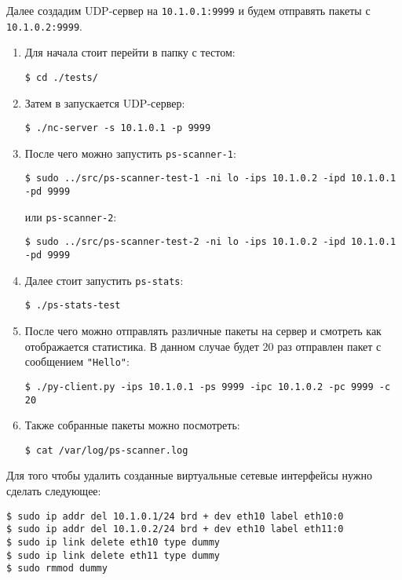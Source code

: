 Далее создадим UDP-сервер на \verb|10.1.0.1:9999| и будем отправять пакеты с \verb|10.1.0.2:9999|.

\begin{enumerate}
\item Для начала стоит перейти в папку с тестом:
\begin{lstlisting}
$ cd ./tests/
\end{lstlisting}

\item Затем в запускается UDP-сервер:
\begin{lstlisting}
$ ./nc-server -s 10.1.0.1 -p 9999
\end{lstlisting}

\item После чего можно запустить \verb|ps-scanner-1|:
\begin{lstlisting}
$ sudo ../src/ps-scanner-test-1 -ni lo -ips 10.1.0.2 -ipd 10.1.0.1 -pd 9999
\end{lstlisting}
или \verb|ps-scanner-2|:
\begin{lstlisting}
$ sudo ../src/ps-scanner-test-2 -ni lo -ips 10.1.0.2 -ipd 10.1.0.1 -pd 9999
\end{lstlisting}

\item Далее стоит запустить \verb|ps-stats|:
\begin{lstlisting}
$ ./ps-stats-test
\end{lstlisting}

\item После чего можно отправлять различные пакеты на сервер и смотреть как отображается статистика. В данном случае будет 20 раз отправлен пакет с сообщением \verb|"Hello"|:
\begin{lstlisting}
$ ./py-client.py -ips 10.1.0.1 -ps 9999 -ipc 10.1.0.2 -pc 9999 -c 20
\end{lstlisting}

\newpage

\item Также собранные пакеты можно посмотреть:
\begin{lstlisting}
$ cat /var/log/ps-scanner.log
\end{lstlisting}
\end{enumerate}

\linespace

Для того чтобы удалить созданные виртуальные сетевые интерфейсы нужно сделать следующее:
\begin{lstlisting}
$ sudo ip addr del 10.1.0.1/24 brd + dev eth10 label eth10:0
$ sudo ip addr del 10.1.0.2/24 brd + dev eth10 label eth11:0
$ sudo ip link delete eth10 type dummy
$ sudo ip link delete eth11 type dummy
$ sudo rmmod dummy
\end{lstlisting}
